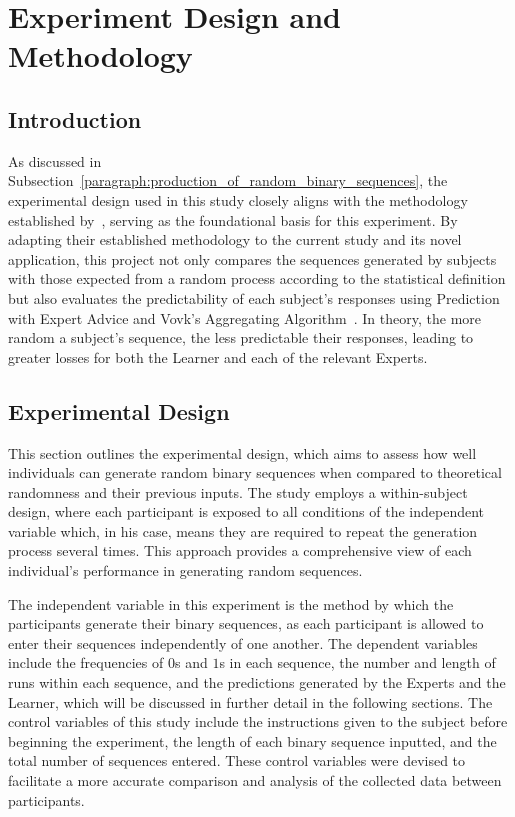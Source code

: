 \section{Experiment Design and Methodology}\label{section:experiment_design_and_methodology}
\subsection{Introduction}\label{subsection:introduction}
As discussed in Subsection~\ref{paragraph:production_of_random_binary_sequences}, the experimental design used in this study closely aligns with the methodology established by~\cite{nickerson:2009}, serving as the foundational basis for this experiment. By adapting their established methodology to the current study and its novel application, this project not only compares the sequences generated by subjects with those expected from a random process according to the statistical definition but also evaluates the predictability of each subject's responses using Prediction with Expert Advice and Vovk's Aggregating Algorithm~\cite{vovk:1990}. In theory, the more random a subject's sequence, the less predictable their responses, leading to greater losses for both the Learner and each of the relevant Experts.

\subsection{Experimental Design}\label{subsection:experimental_design}
This section outlines the experimental design, which aims to assess how well individuals can generate random binary sequences when compared to theoretical randomness and their previous inputs. The study employs a within-subject design, where each participant is exposed to all conditions of the independent variable which, in his case, means they are required to repeat the generation process several times. This approach provides a comprehensive view of each individual's performance in generating random sequences.

The independent variable in this experiment is the method by which the participants generate their binary sequences, as each participant is allowed to enter their sequences independently of one another. The dependent variables include the frequencies of $0$s and $1$s in each sequence, the number and length of runs within each sequence, and the predictions generated by the Experts and the Learner, which will be discussed in further detail in the following sections. The control variables of this study include the instructions given to the subject before beginning the experiment, the length of each binary sequence inputted, and the total number of sequences entered. These control variables were devised to facilitate a more accurate comparison and analysis of the collected data between participants.


